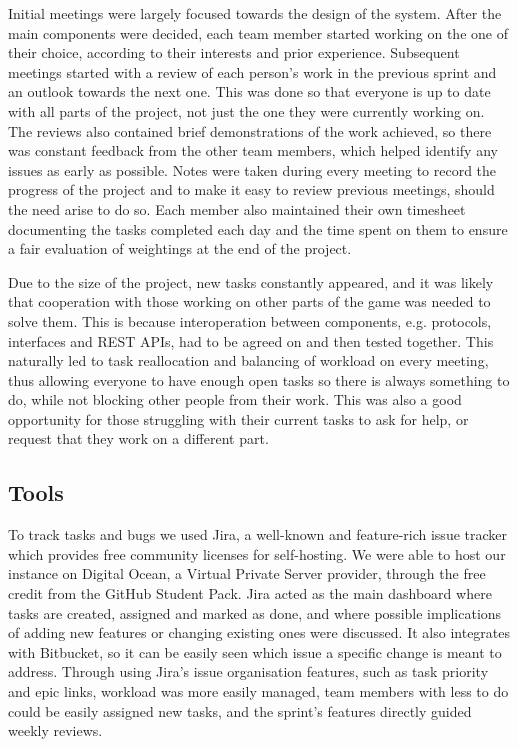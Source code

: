 \documentclass[a4paper,11pt]{article}
\begin{document}
Initial meetings were largely focused towards the design of the system. After the main components were decided, each team member started working on the one of their choice, according to their interests and prior experience. Subsequent meetings started with a review of each person’s work in the previous sprint and an outlook towards the next one. This was done so that everyone is up to date with all parts of the project, not just the one they were currently working on. The reviews also contained brief demonstrations of the work achieved, so there was constant feedback from the other team members, which helped identify any issues as early as possible. Notes were taken during every meeting to record the progress of the project and to make it easy to review previous meetings, should the need arise to do so. Each member also maintained their own timesheet documenting the tasks completed each day and the time spent on them to ensure a fair evaluation of weightings at the end of the project.

Due to the size of the project, new tasks constantly appeared, and it was likely that cooperation with those working on other parts of the game was needed to solve them. This is because interoperation between components, e.g. protocols, interfaces and REST APIs, had to be agreed on and then tested together. This naturally led to task reallocation and balancing of workload on every meeting, thus allowing everyone to have enough open tasks so there is always something to do, while not blocking other people from their work. This was also a good opportunity for those struggling with their current tasks to ask for help, or request that they work on a different part.

\subsection{Tools}

To track tasks and bugs we used Jira, a well-known and feature-rich issue tracker which provides free community licenses for self-hosting. We were able to host our instance on Digital Ocean, a Virtual Private Server provider, through the free credit from the GitHub Student Pack. Jira acted as the main dashboard where tasks are created, assigned and marked as done, and where possible implications of adding new features or changing existing ones were discussed. It also integrates with Bitbucket, so it can be easily seen which issue a specific change is meant to address. Through using Jira’s issue organisation features, such as task priority and epic links, workload was more easily managed, team members with less to do could be easily assigned new tasks, and the sprint’s features directly guided weekly reviews.
\end{document}
